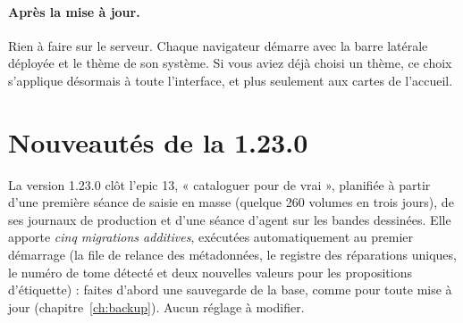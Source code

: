 \paragraph{Après la mise à jour.} Rien à faire sur le serveur. Chaque
navigateur démarre avec la barre latérale déployée et le thème de son
système. Si vous aviez déjà choisi un thème, ce choix s'applique
désormais à toute l'interface, et plus seulement aux cartes de
l'accueil.

\section{Nouveautés de la 1.23.0}\label{sec:whats-new-1.23.0}

La version 1.23.0 clôt l'epic 13, « cataloguer pour de vrai »,
planifiée à partir d'une première séance de saisie en masse (quelque
260 volumes en trois jours), de ses journaux de production et d'une
séance d'agent sur les bandes dessinées. Elle apporte \emph{cinq
migrations additives}, exécutées automatiquement au premier démarrage
(la file de relance des métadonnées, le registre des réparations
uniques, le numéro de tome détecté et deux nouvelles valeurs pour les
propositions d'étiquette) : faites d'abord une sauvegarde de la base,
comme pour toute mise à jour (chapitre~\ref{ch:backup}). Aucun réglage
à modifier.

